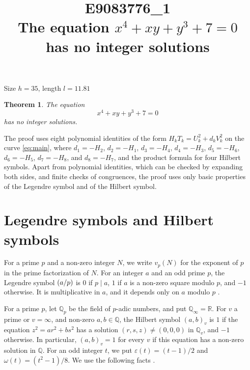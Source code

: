 \documentclass[11pt]{article}
\title{\textbf{E9083776\_1}\\[4pt] {\Large The equation $x^{4}+xy+y^{3}+7=0$ has no integer solutions}}
\author{}
\date{}
\newtheorem{theorem}{Theorem}
\newcommand{\Q}{\mathbb{Q}}
\newcommand{\leg}[2]{\mathchoice{\biggl(\dfrac{#1}{#2}\biggr)}{(#1/#2)}{(#1/#2)}{(#1/#2)}}
\begin{document}
\maketitle
\vspace{-8ex}
\begin{center}
Size $h=35$, length $l=11.81$
\end{center}

\begin{theorem}\label{thm:main}
The equation
\begin{equation}\label{eq:main}
x^{4}+xy+y^{3}+7=0
\end{equation}
has no integer solutions.
\end{theorem}

The proof uses eight polynomial identities of the form $H_kT_k=U_k^2+d_kV_k^2$ on the curve \eqref{eq:main}, where $d_{1}=-H_{2}$, $d_{2}=-H_{1}$, $d_{3}=-H_{4}$, $d_{4}=-H_{3}$, $d_{5}=-H_{6}$, $d_{6}=-H_{5}$, $d_{7}=-H_{8}$, and $d_{8}=-H_{7}$, and the product formula for four Hilbert symbols. Apart from polynomial identities, which can be checked by expanding both sides, and finite checks of congruences, the proof uses only basic properties of the Legendre symbol and of the Hilbert symbol.

\section{Legendre symbols and Hilbert symbols}

For a prime $p$ and a non-zero integer $N$, we write $v_p(N)$ for the exponent of $p$ in the prime factorization of $N$. For an integer $a$ and an odd prime $p$, the Legendre symbol $\leg{a}{p}$ is $0$ if $p\mid a$, $1$ if $a$ is a non-zero square modulo $p$, and $-1$ otherwise. It is multiplicative in $a$, and it depends only on $a$ modulo $p$ \cite[Chapter~5]{IR}.

For a prime $p$, let $\Q_p$ be the field of $p$-adic numbers, and put $\Q_\infty=\mathbb R$. For $v$ a prime or $v=\infty$, and non-zero $a,b\in\Q$, the Hilbert symbol $(a,b)_v$ is $1$ if the equation $z^2=ar^2+bs^2$ has a solution $(r,s,z)\neq(0,0,0)$ in $\Q_v$, and $-1$ otherwise. In particular, $(a,b)_v=1$ for every $v$ if this equation has a non-zero solution in $\Q$. For an odd integer $t$, we put $\varepsilon(t)=(t-1)/2$ and $\omega(t)=(t^2-1)/8$. We use the following facts \cite[Chapter~III, Proposition~2 and Theorems~1 and~3]{Se}.
\end{document}
